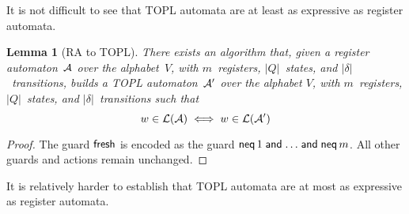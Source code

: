 \documentclass[9pt, preprint]{sigplanconf} %
\newtheorem{lemma}{Lemma}
\theoremstyle{definition}
\theoremstyle{remark}
\begin{document}
It is not difficult to see that TOPL automata are at least as expressive as register automata.

\begin{lemma}[RA to TOPL]\label{lemma:ra-to-topl}
There exists an algorithm that, given a register automaton~${\cal A}$ over the alphabet~$V$, with $m$~registers, $|Q|$~states, and $|\delta|$~transitions, builds a TOPL automaton~${\cal A}'$ over the alphabet $V$, with $m$~registers, $|Q|$~states, and $|\delta|$~transitions such that
\[w\in{\cal L}({\cal A}) \iff w\in{\cal L}({\cal A}') \]
\end{lemma}
\begin{proof}
The guard ${\sf fresh}$ is encoded as the guard ${\sf neq}\,1 \mathrel{\sf and} \ldots \mathrel{\sf and}{\sf neq}\,m$.
All other guards and actions remain unchanged.
\end{proof}

It is relatively harder to establish that TOPL automata are at most as expressive as register automata.
\end{document}
